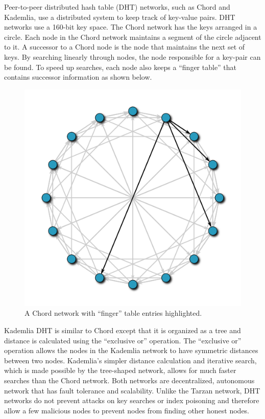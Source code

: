 Peer-to-peer distributed hash table (DHT) networks, such as Chord and Kademlia, use a distributed system to keep track of key-value pairs. DHT networks use a 160-bit key space. The Chord network has the keys arranged in a circle. Each node in the Chord network maintains a segment of the circle adjacent to it. A successor to a Chord node is the node that maintains the next set of keys. By searching linearly through nodes, the node responsible for a key-pair can be found. To speed up searches, each node also keeps a “finger table” that contains successor information as shown below.

\begin{figure}[ht!]
\begin{center}
\includegraphics[scale=0.5]{./images/chord.png}
\caption{A Chord network with ``finger'' table entries highlighted.}
\label{fig:chord}
\end{center}
\end{figure}

Kademlia DHT is similar to Chord except that it is organized as a tree and distance is calculated using the “exclusive or” operation. The “exclusive or” operation allows the nodes in the Kademlia network to have symmetric distances between two nodes. Kademlia’s simpler distance calculation and iterative search, which is made possible by the tree-shaped network, allows for much faster searches than the Chord network. Both networks are decentralized, autonomous network that has fault tolerance and scalability. Unlike the Tarzan network, DHT networks do not prevent attacks on key searches or index poisoning and therefore allow a few malicious nodes to prevent nodes from finding other honest nodes.